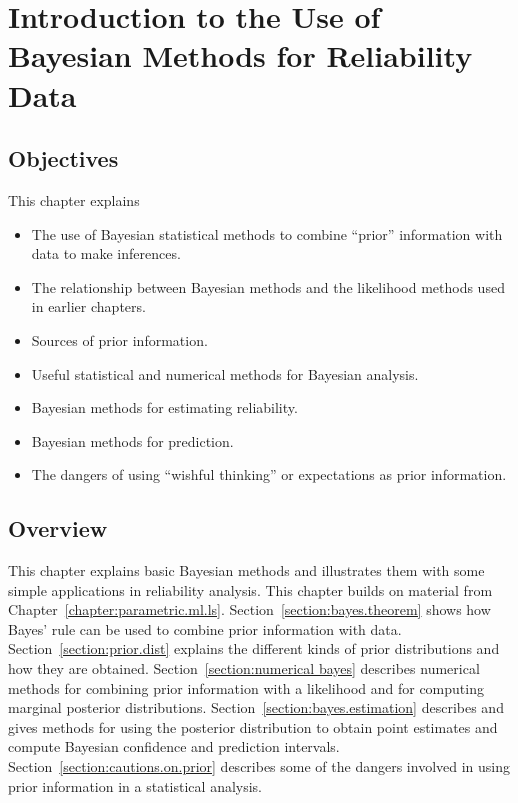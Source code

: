 
\setcounter{chapter}{13}

\chapter{Introduction to the Use of
Bayesian Methods for Reliability Data}

\label{chapter:singledist.bayes}



\section*{Objectives}
This chapter explains
\begin{itemize} 
\item 
The use of Bayesian statistical methods to
combine ``prior'' information with data to make inferences.
\item
The relationship between Bayesian methods and the likelihood methods
used in earlier chapters.
\item 
Sources of prior information.
\item 
Useful statistical and numerical methods for Bayesian analysis.
\item
Bayesian methods for estimating reliability.
\item
Bayesian methods for prediction.
\item 
The dangers of using ``wishful thinking'' or
expectations as prior information.
\end{itemize}

\section*{Overview}
This chapter explains basic Bayesian methods and illustrates
them with some simple applications in reliability analysis. This
chapter builds on material from
Chapter~\ref{chapter:parametric.ml.ls}.
Section~\ref{section:bayes.theorem} shows how Bayes' rule can be
used to combine prior information with data.
Section~\ref{section:prior.dist} explains the different kinds of
prior distributions and how they are obtained.
Section~\ref{section:numerical bayes} describes numerical methods
for combining prior information with a likelihood and for computing
marginal posterior distributions.
Section~\ref{section:bayes.estimation} describes and gives methods
for using the posterior distribution to obtain point estimates and
compute Bayesian confidence and prediction intervals.
Section~\ref{section:cautions.on.prior} describes some of the
dangers involved in using prior information in a statistical
analysis.

